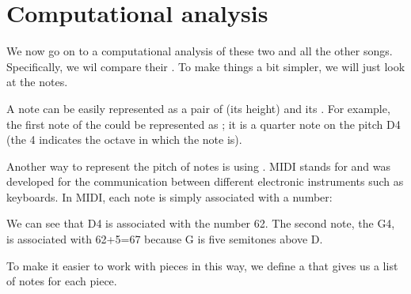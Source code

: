 \documentclass[letterpaper,10pt,english]{sphinxmanual}
\let\sphinxpxdimen\pdfpxdimen\else\newdimen\sphinxpxdimen
\begin{document}
\section{Computational analysis}
\label{\detokenize{03_melody_I:Computational-analysis}}
\sphinxAtStartPar
We now go on to a computational analysis of these two and all the other songs. Specifically, we wil compare their . To make things a bit simpler, we will just look at the notes.

\sphinxAtStartPar
A note can be easily represented as a pair of  (its height) and its . For example, the first note of the  could be represented as ; it is a quarter note on the pitch D4 (the 4 indicates the octave in which the note is).

\sphinxAtStartPar
Another way to represent the pitch of notes is using . MIDI stands for  and was developed for the communication between different electronic instruments such as keyboards. In MIDI, each note is simply associated with a number:

\sphinxAtStartPar
\sphinxincludegraphics[width=2167\sphinxpxdimen,height=465\sphinxpxdimen]{{midi_pitch}.png} 

\sphinxAtStartPar
We can see that D4 is associated with the number 62. The second note, the G4, is associated with 62+5=67 because G is five semitones above D.

\sphinxAtStartPar
To make it easier to work with pieces in this way, we define a  that gives us a list of notes for each piece.
\end{document}
